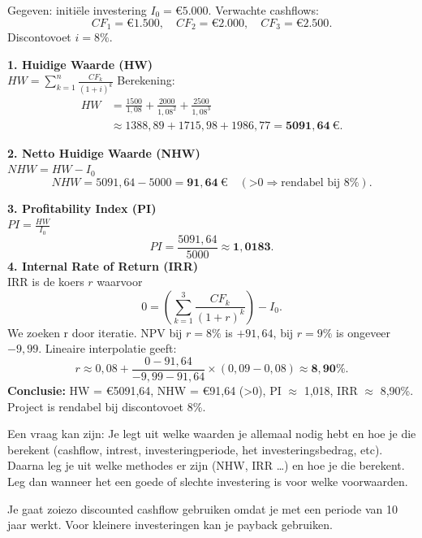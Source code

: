 \documentclass[a4paper,11pt]{article}
\begin{document}
\begin{oefenblok}[title={Oefening: Discounted Cashflow — HW, NHW, IRR, PI}]
Gegeven: initiële investering $I_0=\text{€}5.000$. Verwachte cashflows:
\[
CF_1=\text{€}1.500,\quad CF_2=\text{€}2.000,\quad CF_3=\text{€}2.500.
\]
Discontovoet $i=8\%$.

\textbf{1. Huidige Waarde (HW)}\\
    $HW=\sum_{k=1}^{n}\frac{CF_k}{(1+i)^k}$
Berekening:
\[
\begin{aligned}
HW &= \frac{1500}{1{,}08}+\frac{2000}{1{,}08^2}+\frac{2500}{1{,}08^3} \\
&\approx 1388{,}89 + 1715{,}98 + 1986{,}77 = \mathbf{5091{,}64\ \text{€}}.
\end{aligned}
\]

\textbf{2. Netto Huidige Waarde (NHW)}\\
    $NHW = HW - I_0$
\[
NHW = 5091{,}64 - 5000 = \mathbf{91{,}64\ \text{€}} \quad (\text{>0} \Rightarrow \text{rendabel bij }8\%).
\]

\textbf{3. Profitability Index (PI)}\\
    $PI = \frac{HW}{I_0}$
\[
PI = \frac{5091{,}64}{5000} \approx \mathbf{1{,}0183}.
\]
\textbf{4. Internal Rate of Return (IRR)}\\
IRR is de koers $r$ waarvoor
\[
0 = \left(\sum_{k=1}^{3}\frac{CF_k}{(1+r)^k}\right) - I_0.
\]
We zoeken r door iteratie. NPV bij $r=8\%$ is $+91{,}64$, bij $r=9\%$ is ongeveer $-9{,}99$. Lineaire interpolatie geeft:
\[
r \approx 0{,}08 + \frac{0-91{,}64}{-9{,}99-91{,}64}\times(0{,}09-0{,}08)
\approx \mathbf{8{,}90\%}.
\]
\textbf{Conclusie:} HW = €5091,64, NHW = €91,64 (>0), PI $\approx$ 1,018, IRR $\approx$ 8,90\%. Project is rendabel bij discontovoet 8\%.
\end{oefenblok}

 \begin{examenbox}
    Een vraag kan zijn: 
    Je legt uit welke waarden je allemaal nodig hebt en hoe je die berekent (cashflow, intrest, investeringperiode, het investeringsbedrag, etc).
    Daarna leg je uit welke methodes er zijn (NHW, IRR \dots) en hoe je die berekent.
    Leg dan wanneer het een goede of slechte investering is voor welke voorwaarden. 
 \end{examenbox}

 \begin{examenbox}
Je gaat zoiezo discounted cashflow gebruiken omdat je met een periode van 10 jaar werkt. Voor kleinere 
investeringen kan je payback gebruiken.
 \end{examenbox}
\end{document}
